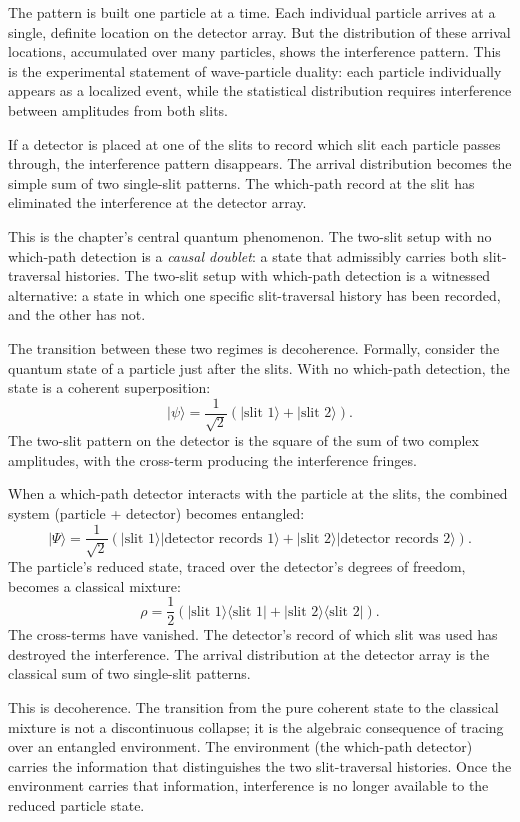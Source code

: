 The pattern is built one particle at a time. Each individual particle
arrives at a single, definite location on the detector array. But the
distribution of these arrival locations, accumulated over many particles,
shows the interference pattern. This is the experimental statement of
wave-particle duality: each particle individually appears as a localized
event, while the statistical distribution requires interference between
amplitudes from both slits.

If a detector is placed at one of the slits to record which slit each
particle passes through, the interference pattern disappears. The arrival
distribution becomes the simple sum of two single-slit patterns. The
which-path record at the slit has eliminated the interference at the
detector array.

This is the chapter's central quantum phenomenon. The two-slit setup with
no which-path detection is a \emph{causal doublet}: a state that
admissibly carries both slit-traversal histories. The two-slit setup with
which-path detection is a witnessed alternative: a state in which one
specific slit-traversal history has been recorded, and the other has
not.

The transition between these two regimes is decoherence. Formally,
consider the quantum state of a particle just after the slits. With no
which-path detection, the state is a coherent superposition:
\[
|\psi\rangle = \frac{1}{\sqrt{2}}(|\text{slit 1}\rangle + |\text{slit 2}\rangle).
\]
The two-slit pattern on the detector is the square of the sum of two
complex amplitudes, with the cross-term producing the interference
fringes.

When a which-path detector interacts with the particle at the slits, the
combined system (particle + detector) becomes entangled:
\[
|\Psi\rangle = \frac{1}{\sqrt{2}}(|\text{slit 1}\rangle |\text{detector
records 1}\rangle + |\text{slit 2}\rangle |\text{detector records 2}\rangle).
\]
The particle's reduced state, traced over the detector's degrees of
freedom, becomes a classical mixture:
\[
\rho = \frac{1}{2}(|\text{slit 1}\rangle\langle\text{slit 1}| + |\text{slit 2}\rangle\langle\text{slit 2}|).
\]
The cross-terms have vanished. The detector's record of which slit was
used has destroyed the interference. The arrival distribution at the
detector array is the classical sum of two single-slit patterns.

This is decoherence. The transition from the pure coherent state to the
classical mixture is not a discontinuous collapse; it is the algebraic
consequence of tracing over an entangled environment. The environment
(the which-path detector) carries the information that distinguishes
the two slit-traversal histories. Once the environment carries that
information, interference is no longer available to the reduced
particle state.

